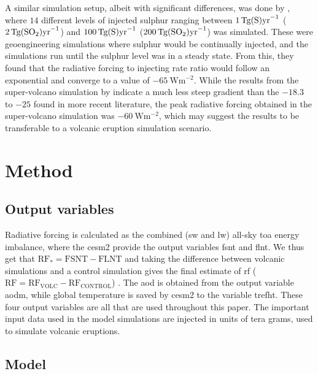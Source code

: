 \documentclass[twocol]{ametsocV5}
\newcommand{\iso}[1][i]{{#1}njected \ce{SO2}}
\begin{document}
A similar simulation setup, albeit with significant differences, was done by
\citet{niemeier2015}, where \(14\) different levels of injected sulphur ranging between
\(\SI{1}{\tera\gram(\ce{S})\mathrm{yr}^{-1}}\)
(\(\SI{2}{\tera\gram(\ce{SO2})\mathrm{yr}^{-1}}\)) and
\(\SI{100}{\tera\gram(\ce{S})\mathrm{yr}^{-1}}\)
(\(\SI{200}{\tera\gram(\ce{SO2})\mathrm{yr}^{-1}}\)) was simulated. These were
geoengineering simulations where sulphur would be continually injected, and the
simulations run until the sulphur level was in a steady state. From this, they found
that the radiative forcing to injecting rate ratio would follow an exponential and
converge to a value of \(\SI{-65}{\watt\metre^{-2}}\). While the results from the
super-volcano simulation by \citet{jones2005} indicate a much less steep gradient than
the \(-18.3\) to \(-25\) found in more recent literature, the peak radiative forcing
obtained in the super-volcano simulation was \(\SI{-60}{\watt\metre^{-2}}\), which may
suggest the \citet{niemeier2015} results to be transferable to a volcanic eruption
simulation scenario.

\section{Method}

\subsection{Output variables}

Radiative forcing is calculated as the combined (\acrshort{sw} and \acrshort{lw})
all-sky \acrshort{toa} energy imbalance, where the \acrshort{cesm2} provide the output
variables \acrfull{fsnt} and \acrfull{flnt}. We thus get that \(\mathrm{RF_*}=
\mathrm{FSNT} - \mathrm{FLNT}\) and taking the difference between volcanic simulations
and a control simulation gives the final estimate of \acrshort{rf}
(\(\mathrm{RF}=\mathrm{RF_{VOLC}}-\mathrm{RF_{CONTROL}}\)) \citep{marshall2020}. The
\acrshort{aod} is obtained from the output variable \acrfull{aodm}, while global
temperature is saved by \acrshort{cesm2} to the variable \acrfull{trefht}. These four
output variables are all that are used throughout this paper. The important input data
used in the model simulations are \iso{} in units of tera grams, used to simulate
volcanic eruptions.

\subsection{Model}
\end{document}

